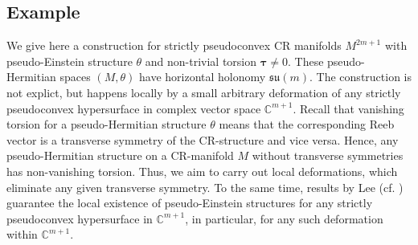\documentclass{amsart}
\theoremstyle{plain}
\theoremstyle{definition}
\def\su{\mathfrak{su}}
\newcommand{\bt}{{\boldsymbol{\tau}}}
\newcommand{\1}{\mathbf{1}}
\newcommand{\+}{\oplus}
\begin{document}
\subsection{Example}


We give here a construction for strictly pseudoconvex CR manifolds $M^{2m+1}$ with pseudo-Einstein structure $\theta$  
and  non-trivial torsion $\bt\neq 0$. These pseudo-Hermitian spaces $(M,\theta)$ have horizontal holonomy $\su(m)$.
The construction is not explict, but happens locally by a small 
arbitrary deformation of any strictly 
pseudoconvex hypersurface in complex vector space $\mathbb{C}^{m+1}$. 
Recall that vanishing torsion for a pseudo-Hermitian structure $\theta$
means that the corresponding Reeb vector is a transverse symmetry  of the CR-structure 
and vice versa. Hence, any pseudo-Hermitian structure on a CR-manifold $M$ without transverse symmetries has non-vanishing torsion.
Thus, we aim to carry out local deformations, which eliminate any 
given transverse symmetry. To the same time, results by 
Lee (cf. \cite{Lee}) guarantee the local existence of pseudo-Einstein structures for any strictly pseudoconvex hypersurface in  $\mathbb{C}^{m+1}$, 
in particular, for any such deformation within $\mathbb{C}^{m+1}$.
\end{document}
